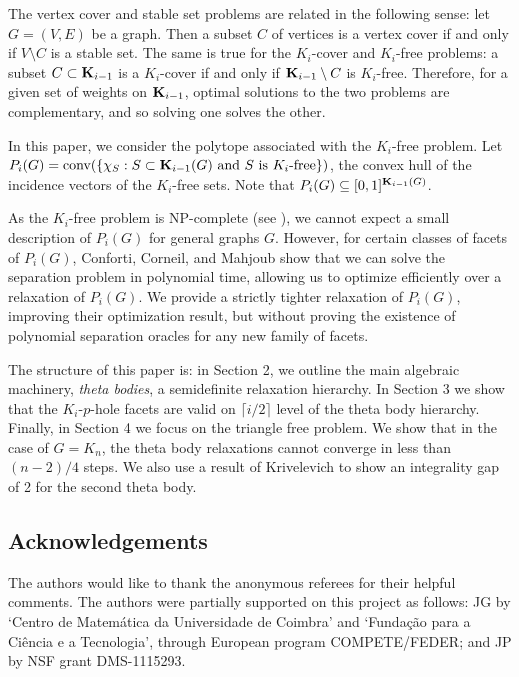 The vertex cover and stable set problems are related in the following sense: let $G = (V,E)$ be a graph. Then a subset $C$ of vertices is a vertex cover if and only if $V \setminus C$ is a stable set. The same is true for the $K_i$-cover and $K_i$-free problems: a subset $C \subset \mathbf{K}_{i-1}$ is a $K_i$-cover if and only if $\mathbf{K}_{i-1} \setminus C$ is $K_i$-free. Therefore, for a given set of weights on $\mathbf{K}_{i-1}$, optimal solutions to the two problems are complementary, and so solving one solves the other.

In this paper, we consider the polytope associated with the $K_i$-free problem. Let 
$P_i(G) = \hbox{conv}(\{\chi_S: S \subset \mathbf{K}_{i-1}(G) \text{ and $S$ is $K_i$-free}\})$, 
the convex hull of the incidence vectors of the $K_i$-free sets. Note that $P_i(G) \subseteq [0,1]^{\mathbf{K}_{i-1}(G)}$.

As the $K_i$-free problem is NP-complete (see \cite{conforti}), we cannot expect a small description of $P_i(G)$ for general graphs $G$. However, for certain classes of facets of $P_i(G)$, Conforti, Corneil, and Mahjoub \cite{conforti} show that we can solve the separation problem in polynomial time, allowing us to optimize efficiently over a relaxation of $P_i(G)$. We provide a strictly tighter relaxation of $P_i(G)$, improving their optimization result, but without proving the existence of polynomial separation oracles for any new family of facets.

The structure of this paper is: in Section 2, we outline the main algebraic
machinery, {\em theta bodies}, a semidefinite relaxation hierarchy. In Section 3
we show that the $K_i$-$p$-hole facets are valid on $\lceil i/2 \rceil$ level of the theta body hierarchy. Finally,
in Section 4 we focus on the triangle free problem. We show that in the case of
$G = K_n$, the theta body relaxations cannot converge in less than $(n-2)/4$ steps.
We also use a result of Krivelevich \cite{krivelevich}  to show an integrality gap of 2 for the second theta body.

\subsection*{Acknowledgements}
The authors would like to thank the anonymous referees for their helpful comments.
The authors were partially supported on this project
as follows: JG by `Centro de Matem\'{a}tica da Universidade de Coimbra' and `Funda\c{c}\~{a}o para a Ci\^{e}ncia e a Tecnologia', through European program COMPETE/FEDER; and JP by NSF grant DMS-1115293.

